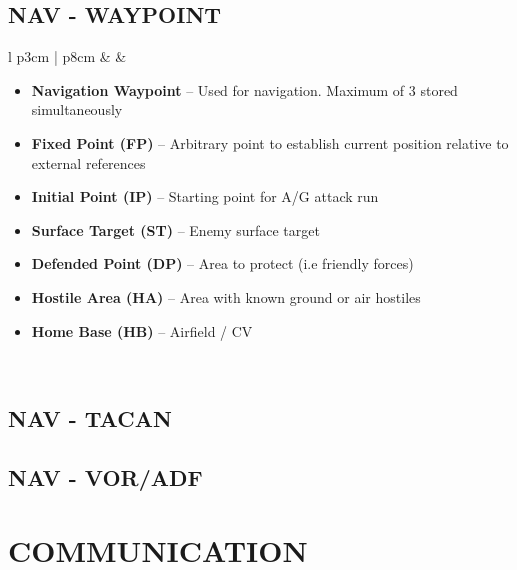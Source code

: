 \documentclass[10pt,usenames,dvipsnames,twoside]{report}
\begin{document}
	\subsection{NAV - WAYPOINT}
	\begin{center}
		\begin{longtable}{l p{3cm} | p{8cm}}
			\toprule
			\textbullet &   &
			\begin{minipage}[t]{\linewidth}
				\vspace{-7pt}
				\begin{itemize}
					\item \textbf{Navigation Waypoint} -- Used for navigation. Maximum of 3 stored simultaneously
					\item \textbf{Fixed Point (FP)} -- Arbitrary point to establish current position relative to external references
					\item \textbf{Initial Point (IP)} -- Starting point for A/G attack run
					\item \textbf{Surface Target (ST)} -- Enemy surface target
					\item \textbf{Defended Point (DP)} -- Area to protect (i.e friendly forces)
					\item \textbf{Hostile Area (HA)} -- Area with known ground or air hostiles
					\item \textbf{Home Base (HB)} -- Airfield / CV
				\end{itemize}
			\end{minipage} \\
			\bottomrule
		\end{longtable}
	\end{center}

	\subsection{NAV - TACAN}
	\subsection{NAV - VOR/ADF}



	\cleardoublepage

	\section{COMMUNICATION}
\end{document}
